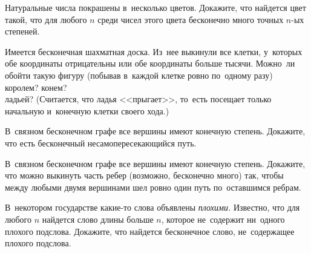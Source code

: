 



\begin{problems}

\item
Натуральные числа покрашены в~несколько цветов.
Докажите, что найдется цвет такой, что для любого $n$ среди чисел этого цвета
бесконечно много точных $n$-ых степеней.

\item
Имеется бесконечная шахматная доска.
Из~нее выкинули все клетки, у~которых обе координаты отрицательны или обе
координаты больше тысячи.
Можно~ли обойти такую фигуру (побывав в~каждой клетке ровно по~одному разу)
\\
\subproblem королем?
\qquad
\subproblem конем?
\\
\subproblem ладьей?\enspace
(Считается, что ладья <<прыгает>>, то~есть посещает только начальную и~конечную
клетки своего хода.)

\item
В~связном бесконечном графе все вершины имеют конечную степень.
Докажите, что есть бесконечный несамопересекающийся путь.

\item
В~связном бесконечном графе все вершины имеют конечную степень.
Докажите, что можно выкинуть часть ребер (возможно, бесконечно много) так,
чтобы между любыми двумя вершинами шел ровно один путь по~оставшимся ребрам.

\item
В~некотором государстве какие-то слова объявлены \emph{плохими.}
Известно, что для любого $n$ найдется слово длины больше $n$, которое
не~содержит ни~одного плохого подслова.
Докажите, что найдется бесконечное слово, не~содержащее плохого подслова.

\end{problems}

